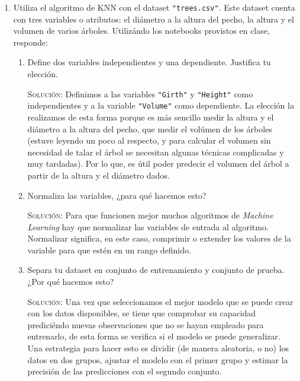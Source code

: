 \documentclass[letterpaper,11pt]{article}
\begin{document}
\begin{enumerate}
\begin{proof}
        Por lo tanto, el polinomio característico de la matriz $A$ puede ser 
        expresado como 
        \begin{equation*}
            p(\lambda) = \lambda^2 - \lambda tr(A) + det(A)
        \end{equation*}
    \end{proof}

    \item Utiliza el algoritmo de KNN con el dataset \texttt{"trees.csv"}. Este 
    dataset cuenta con tres variables o atributos: el diámetro a la altura del 
    pecho, la altura y el volumen de varios árboles. Utilizándo los notebooks 
    provistos en clase, responde:
    \begin{enumerate}
        \item Define dos variables independientes y una dependiente. Justifica 
        tu elección.

        \textsc{Solución:} Definimos a las variables \texttt{"Girth"} y 
        \texttt{"Height"} como independientes y a la variable \texttt{"Volume"}
        como dependiente. La elección la realizamos de esta forma porque es 
        más sencillo medir la altura y el diámetro a la altura del pecho, que 
        medir el volúmen de los árboles (estuve leyendo un poco al respecto, y 
        para calcular el volumen sin necesidad de talar el árbol se necesitan 
        algunas técnicas complicadas y muy tardadas). Por lo que, es útil poder 
        predecir el volumen del árbol a partir de la altura y el diámetro dados.

        \item Normaliza las variables, ¿para qué hacemos esto?

        \textsc{Solución:} Para que funcionen mejor muchos algoritmos de 
        \textit{Machine Learning} hay que normalizar las variables de entrada 
        al algoritmo. Normalizar significa, en este caso, comprimir o extender 
        los valores de la variable para que estén en un rango definido.

        \item Separa tu dataset en conjunto de entrenamiento y conjunto de 
        prueba. ¿Por qué hacemos esto?

        \textsc{Solución:} Una vez que seleccionamos el mejor modelo que se 
        puede crear con los datos disponibles, se tiene que comprobar su 
        capacidad prediciéndo nuevas observaciones que no se hayan empleado 
        para entrenarlo, de esta forma se verifica si el modelo se puede 
        generalizar. Una estrategia para hacer esto es dividir (de manera 
        aleatoria, o no) los datos en dos grupos, ajustar el modelo con el 
        primer grupo y estimar la precisión de las predicciones con el 
        segundo conjunto.


\end{enumerate}
\end{enumerate}
\end{document}

